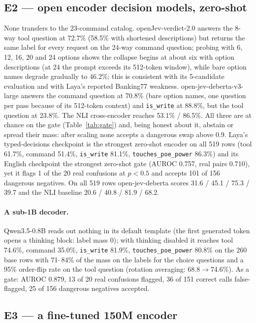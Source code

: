 \documentclass[11pt]{article}
\begin{document}
\subsection{E2 --- open encoder decision models, zero-shot}

None transfers to the 23-command catalog. openJev-verdict-2.0 answers the 8-way tool question at
72.7\% (58.5\% with shortened descriptions) but returns the same label for every request on the
24-way command question; probing with 6, 12, 16, 20 and 24 options shows the collapse begins at
about six with option descriptions (at 24 the prompt exceeds its 512-token window), while bare
option names degrade gradually to 46.2\%; this is consistent with its 5-candidate evaluation and
with Laya's reported Banking77 weakness. open-jev-deberta-v3-large answers the command question at 70.8\% (bare option names,
one question per pass because of its 512-token context) and \texttt{is\_write} at 88.8\%, but
the tool question at 23.8\%. The NLI cross-encoder reaches 53.1\% / 86.5\%. All three are at
chance on the gate (Table~\ref{tab:gate}) and, being honest about it, abstain or spread their
mass: after scaling none accepts a dangerous swap above 0.9. Laya's typed-decisions checkpoint
is the strongest zero-shot encoder on all 519 rows (tool 61.7\%, command 51.4\%, \texttt{is\_write}
81.1\%, \texttt{touches\_poe\_power} 86.3\%) and its English checkpoint the strongest zero-shot
gate (AUROC 0.757, real pairs 0.710), yet it flags 1 of the 20 real confusions at $p<0.5$ and
accepts 101 of 156 dangerous negatives. On all 519 rows open-jev-deberta scores 31.6 / 45.1 / 75.3 /
39.7 and the NLI baseline 20.6 / 40.8 / 81.9 / 68.2.

\paragraph{A sub-1B decoder.} Qwen3.5-0.8B reads out nothing in its default template (the first
generated token opens a thinking block: label mass 0); with thinking disabled it reaches tool
74.6\%, command 35.0\%, \texttt{is\_write} 81.9\%, \texttt{touches\_poe\_power} 80.8\% on the 260
base rows with 71--84\% of the mass on the labels for the choice questions and a 95\% order-flip
rate on the tool question (rotation averaging: 68.8$\to$74.6\%). As a gate: AUROC 0.879, 13 of
20 real confusions flagged, 36 of 151 correct calls false-flagged, 25 of 156 dangerous negatives
accepted.

\subsection{E3 --- a fine-tuned 150M encoder}
\end{document}
